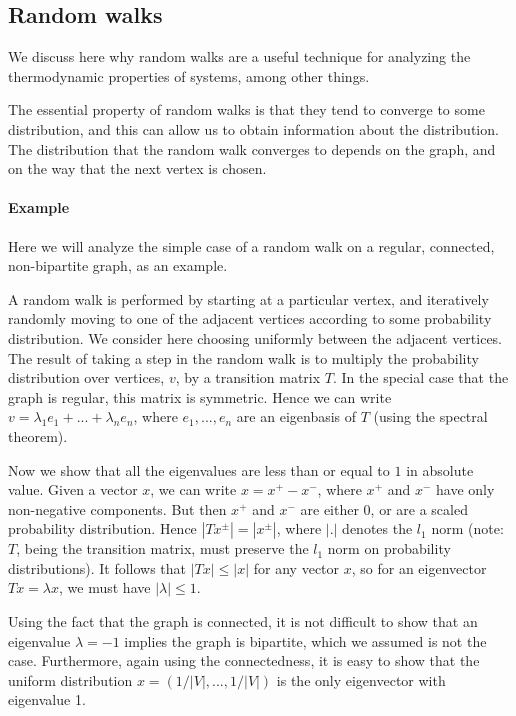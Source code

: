 \documentclass{article}
\begin{document}
\subsection{Random walks}
We discuss here why random walks are a useful technique for analyzing the thermodynamic properties of systems, among other things.

The essential property of random walks is that they tend to converge to some distribution, and this can allow us to obtain information about the distribution.
The distribution that the random walk converges to depends on the graph, and on the way that the next vertex is chosen.

\paragraph{Example}
Here we will analyze the simple case of a random walk on a regular, connected, non-bipartite graph, as an example.

A random walk is performed by starting at a particular vertex, and iteratively randomly moving to one of the adjacent vertices according to some probability distribution.
We consider here choosing uniformly between the adjacent vertices.
The result of taking a step in the random walk is to multiply the probability distribution over vertices, $v$, by a transition matrix $T$.
In the special case that the graph is regular, this matrix is symmetric.
Hence we can write $v = \lambda_1e_1 + ... + \lambda_ne_n$, where $e_1, ..., e_n$ are an eigenbasis of $T$ (using the spectral theorem).

Now we show that all the eigenvalues are less than or equal to $1$ in absolute value.
Given a vector $x$, we can write $x = x^+ - x^-$, where $x^+$ and $x^-$ have only non-negative components.
But then $x^+$ and $x^-$ are either 0, or are a scaled probability distribution.
Hence $|Tx^\pm| = |x^\pm|$, where $|.|$ denotes the $l_1$ norm (note: $T$, being the transition matrix, must preserve the $l_1$ norm on probability distributions).
It follows that $|Tx| \leq |x|$ for any vector $x$, so for an eigenvector $Tx = \lambda x$, we must have $|\lambda| \leq 1$.

Using the fact that the graph is connected, it is not difficult to show that an eigenvalue $\lambda = -1$ implies the graph is bipartite, which we assumed is not the case.
Furthermore, again using the connectedness, it is easy to show that the uniform distribution $x = (1/|V|, ..., 1/|V|)$ is the only eigenvector with eigenvalue 1.
\end{document}
